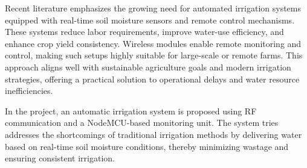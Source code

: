 Recent literature emphasizes the growing need for automated irrigation systems equipped with real-time soil moisture sensors and remote control mechanisms. These systems reduce labor requirements, improve water-use efficiency, and enhance crop yield consistency. Wireless modules enable remote monitoring and control, making such setups highly suitable for large-scale or remote farms. This approach aligns well with sustainable agriculture goals and modern irrigation strategies, offering a practical solution to operational delays and water resource inefficiencies\cite{water2018}.

In the project, an automatic irrigation system is proposed using RF communication and a NodeMCU-based monitoring unit. The system tries addresses the shortcomings of traditional irrigation methods by delivering water based on real-time soil moisture conditions, thereby minimizing wastage and ensuring consistent irrigation.